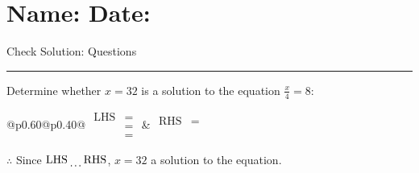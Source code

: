 \documentclass[12pt]{article}
\def \HeadingQuestions {\section*{\Large Name: \underline{\hspace{8cm}} \hfill Date: \underline{\hspace{3cm}}} \vspace{-3mm}
{Check Solution: Questions} \vspace{1pt}\hrule}
\newcounter{minipagecount}
\begin{document}
\HeadingQuestions
\vspace{4mm}
\begin{multicols}{2}
\noindent{(\theminipagecount)}\hspace{0.1mm} %
\begin{minipage}[t]{0.40\textwidth} %

    \noindent Determine whether \(x = 32\) is a solution to the equation \(\frac{x}{4} = 8\):
    \vspace{2pt}  %

    \noindent
    \renewcommand{\arraystretch}{1.3} %
    \begin{tabular}{@{}p{0.60\linewidth}@{}p{0.40\linewidth}@{}}
        \(\begin{aligned}
            \text{LHS} &=  \\
                    &=  \\
                    &= 
        \end{aligned}\) &
        \(\begin{aligned}
            \text{RHS} &= \\
                    & \\
                    &
        \end{aligned}\)
    \end{tabular}
    \renewcommand{\arraystretch}{1.0} %
    \vspace{2pt}  %

    \noindent \(\therefore\) Since \(\text{LHS} \dotuline{\hspace{5mm}} \text{RHS}\), \(x = 32\) \dotuline{\hspace{12mm}} a solution to the equation.

\end{minipage}

\vspace*{0.5ex}
\vfill{}
\noindent{(\theminipagecount)}\hspace{0.1mm} %
\begin{minipage}[t]{0.40\textwidth} %


\end{minipage}
\end{multicols}
\end{document}
